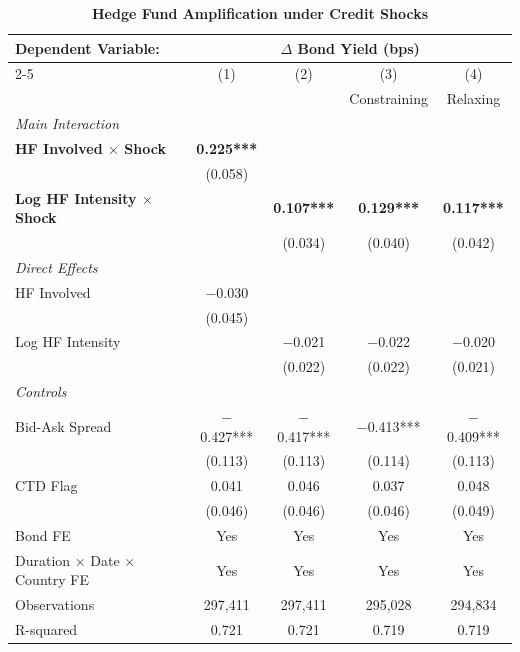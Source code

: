 \documentclass[english, 11pt, oneside]{article}
\begin{document}
\begin{table}[t]
\centering
\caption{\textbf{Hedge Fund Amplification under Credit Shocks}}
\footnotesize
\setlength{\tabcolsep}{9pt}
\renewcommand{\arraystretch}{1.1}
\begin{tabular}{l c c c c}
\toprule
\textbf{Dependent Variable:} & \multicolumn{4}{c}{\textbf{$\Delta$ Bond Yield (bps)}} \\
\cmidrule(lr){2-5}
 & (1) & (2) & (3) & (4) \\
 & & & Constraining & Relaxing \\
\midrule
\textit{Main Interaction} & & & & \\
\textbf{HF Involved $\times$ Shock} & \textbf{0.225***} & & & \\
 & (0.058) & & & \\
\textbf{Log HF Intensity $\times$ Shock} & & \textbf{0.107***} & \textbf{0.129***} & \textbf{0.117***} \\
 & & (0.034) & (0.040) & (0.042) \\
\addlinespace
\textit{Direct Effects} & & & & \\
HF Involved & $-$0.030 & & & \\
 & (0.045) & & & \\
Log HF Intensity & & $-$0.021 & $-$0.022 & $-$0.020 \\
 & & (0.022) & (0.022) & (0.021) \\
\addlinespace
\textit{Controls} & & & & \\
Bid-Ask Spread & $-$0.427*** & $-$0.417*** & $-$0.413*** & $-$0.409*** \\
 & (0.113) & (0.113) & (0.114) & (0.113) \\
CTD Flag & 0.041 & 0.046 & 0.037 & 0.048 \\
 & (0.046) & (0.046) & (0.046) & (0.049) \\
\midrule
Bond FE & Yes & Yes & Yes & Yes \\
Duration $\times$ Date $\times$ Country FE & Yes & Yes & Yes & Yes \\
\midrule
Observations & 297,411 & 297,411 & 295,028 & 294,834 \\
R-squared & 0.721 & 0.721 & 0.719 & 0.719 \\
\bottomrule
\end{tabular}
\label{tab:cds_robustness}


\end{table}
\end{document}
